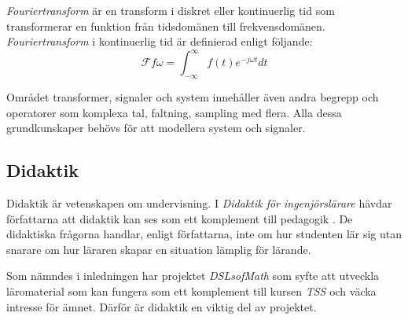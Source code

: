 \documentclass[12pt,a4paper,twoside,openright]{article}
\begin{document}
\textit{Fouriertransform} är en transform i diskret eller
kontinuerlig tid som transformerar en funktion från tidsdomänen till
frekvensdomänen. \textit{Fouriertransform} i kontinuerlig tid är
definierad enligt följande:
\[\mathcal{F} f \omega = \int_{-\infty}^{\infty} f(t) e^{-j \omega t} dt\]






Området transformer, signaler och system innehåller även andra begrepp
och operatorer som komplexa tal, faltning, sampling med flera. Alla
dessa grundkunskaper behövs för att modellera system och signaler.

\subsection{Didaktik}
\label{sec:didaktik}
Didaktik är vetenskapen om undervisning. I \textit{Didaktik för
 ingenjörslärare} hävdar författarna att didaktik kan ses som ett
komplement till pedagogik \cite{didaktik_for_ingenjorslarare}. De didaktiska frågorna handlar, enligt
författarna, inte om hur studenten lär sig utan snarare om hur läraren
skapar en situation lämplig för lärande.

Som nämndes i inledningen har projektet \textit{DSLsofMath}
 som syfte att utveckla läromaterial som kan fungera som ett
komplement till kursen \textit{TSS} och väcka intresse för ämnet.
Därför är didaktik en viktig del av projektet.
\end{document}
